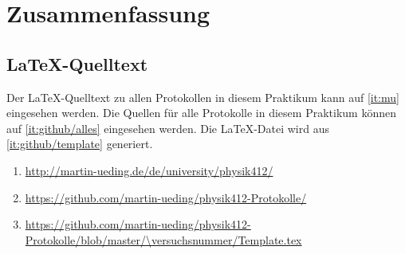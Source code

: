
\FloatBarrier
\chapter{Zusammenfassung}

\fehlt


\FloatBarrier
\begin{appendix}
    \FloatBarrier
    \chapter{\LaTeX-Quelltext}

    Der \LaTeX-Quelltext zu allen Protokollen in diesem Praktikum kann auf
    \ref{it:mu} eingesehen werden. Die Quellen für alle Protokolle in diesem
    Praktikum können auf \ref{it:github/alles} eingesehen werden. Die
    \LaTeX-Datei wird aus \ref{it:github/template} generiert.

    \begin{enumerate}
        \item
            \label{it:mu}
            \url{http://martin-ueding.de/de/university/physik412/}
        \item
            \label{it:github/alles}
            \url{https://github.com/martin-ueding/physik412-Protokolle/}
        \item
            \label{it:github/template}
            \url{https://github.com/martin-ueding/physik412-Protokolle/blob/master/\versuchsnummer/Template.tex}
    \end{enumerate}
\end{appendix}


\FloatBarrier
\printbibliography



